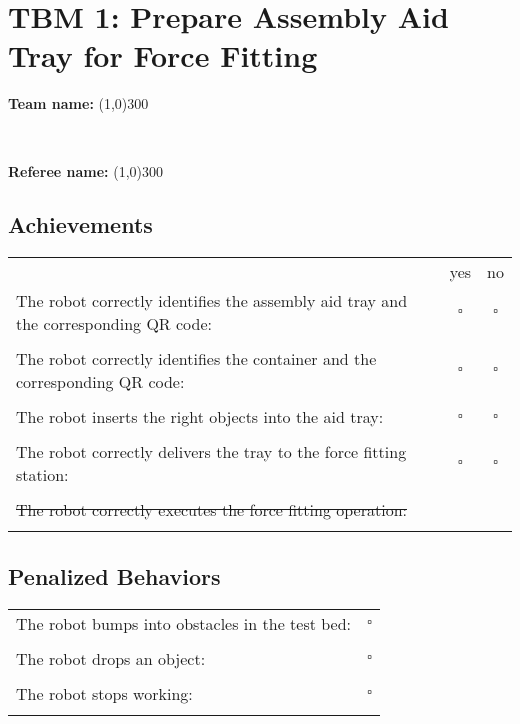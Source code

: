 \section*{TBM 1: Prepare Assembly Aid Tray for Force Fitting}
\vspace{0.5cm} \begin{large} \textbf{Team name:} \line(1,0){300} \end{large} \vspace{0.7cm} \\ 
\vspace{0.5cm} \begin{large} \textbf{Referee name:} \line(1,0){300} \end{large} \vspace{0.2cm}

\subsection*{Achievements}
\begin{tabular}{ l c c}
 & yes & no \\
The robot correctly identifies the assembly aid tray and the corresponding QR code: & $\square$ & $\square$\\ \\
The robot correctly identifies the container and the corresponding QR code: & $\square$ & $\square$\\ \\
The robot inserts the right objects into the aid tray: & $\square$ & $\square$\\ \\
The robot correctly delivers the tray to the force fitting station: & $\square$ & $\square$\\ \\
\st{The robot correctly executes the force fitting operation:} &  &\\ \\
\end{tabular}

\subsection*{Penalized Behaviors}
\begin{tabular}{ l c}
The robot bumps into obstacles in the test bed: & $\square$ \\ \\
The robot drops an object: & $\square$ \\ \\
The robot stops working: & $\square$ \\ \\
\end{tabular}

